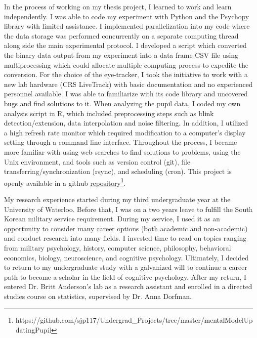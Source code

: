 \documentclass[12pt]{article}
\begin{document}
In the process of working on my thesis project, I learned to work and learn independently. I was able to code my experiment with Python and the Psychopy library with limited assistance. I implemented parallelization into my code where the data storage was performed concurrently on a separate computing thread along side the main experimental protocol. I developed a script which converted the binary data output from my experiment into a data frame CSV file using multiprocessing which could allocate multiple computing process to expedite the conversion. For the choice of the eye-tracker, I took the initiative to work with a new lab hardware (CRS LiveTrack) with basic documentation and no experienced personnel available. I was able to familiarize with its code library and uncovered bugs and find solutions to it. When analyzing the pupil data, I coded my own analysis script in R, which included preprocessing steps such as blink detection/extension, data interpolation and noise filtering. In addition, I utilized a high refresh rate monitor which required modification to a computer’s display setting through a command line interface. Throughout the process, I became more familiar with using web searches to find solutions to problems, using the Unix environment, and tools such as version control (git), file transferring/synchronization (rsync), and scheduling (cron). This project is openly available in a github \href{https://github.com/sjp117/Undergrad_Projects/tree/master/mentalModelUpdatingPupil}{repository}\footnote{https://github.com/sjp117/Undergrad\_Projects/tree/master/mentalModelUpdatingPupil}.

My research experience started during my third undergraduate year at the University of Waterloo. Before that, I was on a two years leave to fulfill the South Korean military service requirement. During my service, I used it as an opportunity to consider many career options (both academic and non-academic) and conduct research into many fields. I invested time to read on topics ranging from military psychology, history, computer science, philosophy, behavioral economics, biology, neuroscience, and cognitive psychology. Ultimately, I decided to return to my undergraduate study with a galvanized will to continue a career path to become a scholar in the field of cognitive psychology. After my return, I entered Dr. Britt Anderson's lab as a research assistant and enrolled in a directed studies course on statistics, supervised by Dr. Anna Dorfman.
\end{document}
